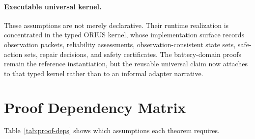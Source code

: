 \paragraph{Executable universal kernel.}
These assumptions are not merely declarative.  Their runtime realization is
concentrated in the typed ORIUS kernel, whose implementation surface records
observation packets, reliability assessments, observation-consistent state
sets, safe-action sets, repair decisions, and safety certificates.  The
battery-domain proofs remain the reference instantiation, but the reusable
universal claim now attaches to that typed kernel rather than to an informal
adapter narrative.


\section{Proof Dependency Matrix}

Table~\ref{tab:proof-deps} shows which assumptions each theorem requires.

